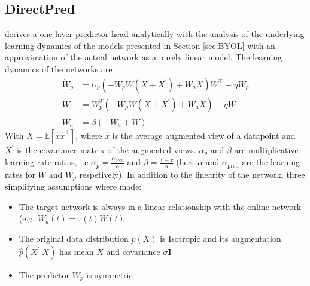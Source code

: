 \subsection{DirectPred} %
\label{sec:DirectPred}
\cite{tian2021understanding} derives a one layer predictor head analytically with the analysis of the underlying learning dynamics of the models presented in Section \ref{sec:BYOL} with an approximation of the actual network as a purely linear model. The learning dynamics of the networks are
\begin{align}
    \dot{W}_p &= \alpha_p (-W_p W ( X + X^{\prime}) + W_a X) W^{\top} - \eta W_p \\
    \dot{W} &= W_p^T (-W_p W (X + X^{\prime}) + W_a X) - \eta W \\
    \dot{W}_a &= \beta (-W_a + W)
\end{align}
With $X = \mathbb{E}[\hat{x}\hat{x}^{\top}]$, where $\hat{x}$ is the average augmented view of a datapoint and $X^{\prime}$ is the covariance matrix of the augmented views. $\alpha_p$ and $\beta$ are multiplicative learning rate ratios, i.e $\alpha_p = \frac{\alpha_{\text{pred}}}{\alpha}$ and $\beta = \frac{1 - \tau}{\alpha}$ (here $\alpha$ and $\alpha_{\text{pred}}$ are the learning rates for $W$ and $W_p$ respetively).
In addition to the linearity of the network, three simplifying assumptions where made: 
\begin{itemize}
    \item The target network is always in a linear relationship with the online network (e.g. $W_a(t) = \tau(t) W(t)$
    \item The original data distribution $p(X)$ is Isotropic and its augmentation $\hat{p}(X^{\prime}|X)$ has mean $X$ and covariance $\sigma \mathbf{I}$
    \item The predictor $W_p$ is symmetric
\end{itemize}

